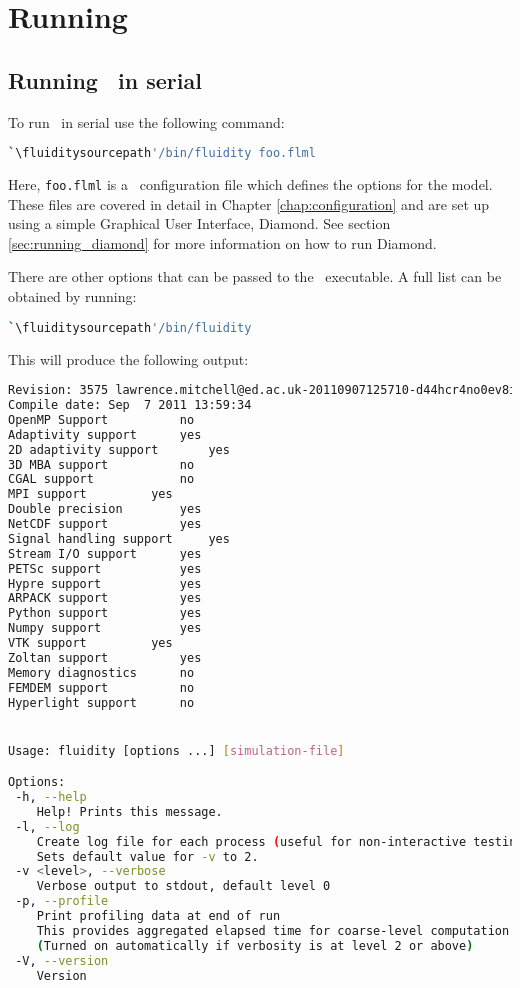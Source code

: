 \section{Running \fluidity}
\label{sec:running_fluidity}


\subsection{Running \fluidity\ in serial}
\label{sec:running_fluidity_in_serial}

To run \fluidity\ in serial use the following command:

\begin{lstlisting}[language=bash]
`\fluiditysourcepath'/bin/fluidity foo.flml
\end{lstlisting}

Here, \lstinline[language=Bash]+foo.flml+ is a \fluidity\ configuration file
which defines the options for the model. These files are covered in detail in 
Chapter \ref{chap:configuration} and are set up using a simple Graphical User
Interface, Diamond. See section \ref{sec:running_diamond} for more information 
on how to run Diamond.

There are other options that can be passed to the \fluidity\ executable. A full
list can be obtained by running:

\begin{lstlisting}[language=bash]
`\fluiditysourcepath'/bin/fluidity
\end{lstlisting}

This will produce the following output:

\begin{lstlisting}[language=Bash]
Revision: 3575 lawrence.mitchell@ed.ac.uk-20110907125710-d44hcr4no0ev8icc
Compile date: Sep  7 2011 13:59:34
OpenMP Support			no
Adaptivity support		yes
2D adaptivity support		yes
3D MBA support			no
CGAL support			no
MPI support			yes
Double precision		yes
NetCDF support			yes
Signal handling support		yes
Stream I/O support		yes
PETSc support			yes
Hypre support			yes
ARPACK support			yes
Python support			yes
Numpy support			yes
VTK support			yes
Zoltan support			yes
Memory diagnostics		no
FEMDEM support			no
Hyperlight support		no


Usage: fluidity [options ...] [simulation-file]

Options:
 -h, --help
    Help! Prints this message.
 -l, --log
    Create log file for each process (useful for non-interactive testing).
    Sets default value for -v to 2.
 -v <level>, --verbose
    Verbose output to stdout, default level 0
 -p, --profile
    Print profiling data at end of run
    This provides aggregated elapsed time for coarse-level computation
    (Turned on automatically if verbosity is at level 2 or above)
 -V, --version
    Version
\end{lstlisting}

